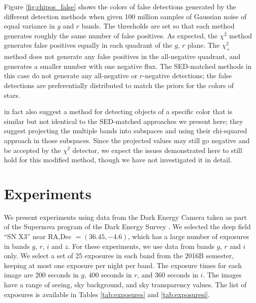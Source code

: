 \documentclass[11pt,letterpaper,linenumbers]{aastex63}
\newcommand{\chipos}{\chi_+}
\begin{document}
Figure \ref{fig:chipos_false} shows the colors of false detections
generated by the different detection methods when given 100 million
samples of Gaussian noise of equal variance in $g$ and $r$ bands.  The
thresholds are set so that each method generates roughly the same
number of false positives.  As expected, the $\chi^2$ method generates
false positives equally in each quadrant of the $g$, $r$ plane.  The
$\chipos^2$ method does not generate any false positives in the
all-negative quadrant, and generates a smaller number with one
negative flux.  The SED-matched methods in this case do not generate
any all-negative or $r$-negative detections; the false detections are
preferentially distributed to match the priors for the colors of
stars.



\cite{szalay1999} in fact also suggest a method for detecting objects
of a specific color that is similar but not identical to the
SED-matched approaches we present here; they suggest projecting the
multiple bands into subspaces and using their chi-squared approach in
those subspaces.  Since the projected values may still go negative and
be accepted by the $\chi^2$ detector, we expect the issues
demonstrated here to still hold for this modified method, though we
have not investigated it in detail.


\section{Experiments}



We present experiments using data from the Dark Energy Camera
\citep{decam} taken as part of the Supernova program \citep{dessn} of
the Dark Energy Survey \citep{des}.  We selected the deep field ``SN
X3'' near RA,Dec $= (36.45, -4.6)$, which has a large number of
exposures in bands $g$, $r$, $i$ and $z$.  For these experiments, we
use data from bands $g$, $r$ and $i$ only.  We select a set of 25
exposures in each band from the 2016B semester, keeping at most one
exposure per night per band.  The exposure times for each image are
200 seconds in $g$, 400 seconds in $r$, and 360 seconds in $i$.  The
images have a range of seeing, sky background, and sky transparency
values.  The list of exposures is available in Tables
\ref{tab:exposures} and \ref{tab:exposuresi}.
\end{document}

